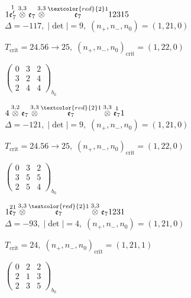 \documentclass[10pt]{article}
\begin{document}
$1\overset{1}{\mathfrak{e}_7'}\overset{3,3}{\otimes}\mathfrak{e}_7\overset{3,3}{\otimes}\overset{\textcolor{red}{2}1}{\mathfrak{e}_7}12315$ \quad $\Delta=-117,\; |\det|=9,\; (n_+,n_-,n_0)=(1,21,0)$

\hspace{1em}$T_{\text{crit}}=24.56 \to 25,\; (n_+,n_-,n_0)_{\text{crit}}=(1,22,0)$

\hspace{2em}$\left(\begin{smallmatrix}0 & 3 & 2 \\ 3 & 2 & 4 \\ 2 & 4 & 4\end{smallmatrix}\right)_{\!b_0}$

\smallskip

$4\overset{3,2}{\otimes}\mathfrak{e}_7\overset{3,3}{\otimes}\overset{\textcolor{red}{2}1}{\mathfrak{e}_7}\overset{3,3}{\otimes}\overset{1}{\mathfrak{e}_7}1$ \quad $\Delta=-121,\; |\det|=9,\; (n_+,n_-,n_0)=(1,21,0)$

\hspace{1em}$T_{\text{crit}}=24.56 \to 25,\; (n_+,n_-,n_0)_{\text{crit}}=(1,22,0)$

\hspace{2em}$\left(\begin{smallmatrix}0 & 3 & 2 \\ 3 & 5 & 5 \\ 2 & 5 & 4\end{smallmatrix}\right)_{\!b_0}$

\smallskip

$1\overset{21}{\mathfrak{e}_7}\overset{3,3}{\otimes}\overset{\textcolor{red}{2}1}{\mathfrak{e}_7}\overset{3,3}{\otimes}\mathfrak{e}_71231$ \quad $\Delta=-93,\; |\det|=4,\; (n_+,n_-,n_0)=(1,21,0)$

\hspace{1em}$T_{\text{crit}}=24,\; (n_+,n_-,n_0)_{\text{crit}}=(1,21,1)$

\hspace{2em}$\left(\begin{smallmatrix}0 & 2 & 2 \\ 2 & 1 & 3 \\ 2 & 3 & 5\end{smallmatrix}\right)_{\!b_0}$
\end{document}
